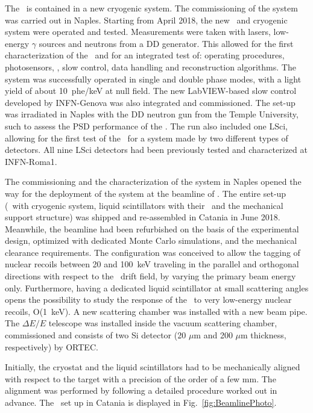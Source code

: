 The \LArTPC\ is contained in a new cryogenic system. The commissioning of the system was carried out in Naples. Starting from April 2018, the new \TPC\ and cryogenic system were operated and tested. Measurements were taken with lasers, low-energy $\gamma$ sources and neutrons from a DD generator. This allowed for the first characterization of the \LArTPC\ and for an integrated test of: operating procedures, photosensors, \DAQ, slow control, data handling and reconstruction algorithms. The system was successfully operated 
in single and double phase modes, with a light yield of about 10~phe/keV at null field. The new LabVIEW-based slow control developed by INFN-Genova was also integrated and commissioned. The set-up was irradiated in Naples with the DD neutron gun from the Temple University, such to assess the PSD performance of the \LArTPC. The run also included one LSci, allowing for the first test of the \DAQ\ for a system made by two different types of detectors. All nine LSci detectors had been previously tested and characterized at INFN-Roma1. 

The commissioning and the characterization of the system in Naples opened the way for the deployment of the system at the beamline of \LNS.  The entire set-up (\TPC\ with cryogenic system, liquid scintillators with their \PMTs\ and the mechanical support structure) was shipped and re-assembled in Catania in June 2018. Meanwhile, the beamline had been refurbished on the basis of the experimental design, optimized with dedicated Monte Carlo simulations, and the mechanical clearance requirements. The configuration was conceived to allow the tagging of nuclear recoils between 20 and 100~keV traveling in the parallel and orthogonal directions with respect to the \TPC\ drift field, by varying the primary beam energy only. Furthermore, having a dedicated liquid scintillator at small scattering angles opens the possibility to study the response of the \TPC\ to very low-energy nuclear recoils, O(1~keV).  A new scattering chamber was installed with a new beam pipe. The $\Delta E/E$ telescope was installed inside the vacuum scattering chamber, commissioned and consists of two Si detector (20 $\mu$m and 200 $\mu$m thickness, respectively) by ORTEC. 

Initially, the cryostat and the liquid scintillators had to be mechanically aligned with respect to the target with a precision of the order of a few mm. The alignment was performed by following a detailed procedure worked out in advance. The \ReD\ set up in Catania is displayed in Fig.~\ref{fig:BeamlinePhoto}. 

